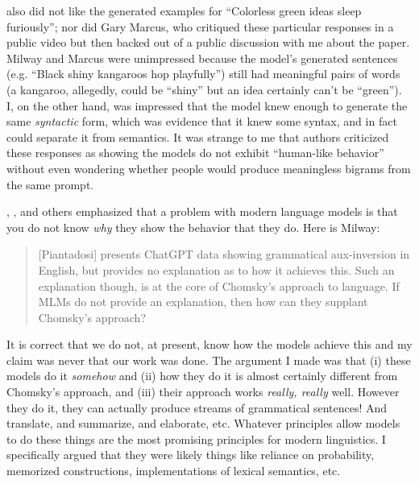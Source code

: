\documentclass[output=paper,colorlinks,citecolor=brown]{langscibook}
\begin{document}
\citet{milway2023response} also did not like the generated examples for ``Colorless green ideas sleep furiously''; nor did Gary Marcus, who critiqued these particular responses in a public video but then backed out of a public discussion with me about the paper. Milway and Marcus were unimpressed because the model's generated sentences (e.g. ``Black shiny kangaroos hop playfully'') still had meaningful pairs of words (a kangaroo, allegedly, could be ``shiny'' but an idea certainly can't be ``green''). I, on the other hand, was impressed that the model knew enough to generate the same \textit{syntactic} form, which was evidence that it knew some syntax, and in fact could separate it from semantics. It was strange to me that authors criticized these responses as showing the models do not exhibit ``human-like behavior'' without even wondering whether people would produce meaningless bigrams from the same prompt.

\citet{milway2023response}, \citet{kodner2023linguistics}, and others emphasized that a problem with modern language models is that you do not know \textit{why} they show the behavior that they do. Here is Milway:
\begin{quote}
[Piantadosi] presents ChatGPT data showing grammatical aux-inversion in English, but provides no explanation as to how it achieves this. Such an explanation though, is at the core of Chomsky’s approach to language. If MLMs do not provide an explanation, then how can they supplant Chomsky’s approach?
\end{quote}
It is correct that we do not, at present, know how the models achieve this and my claim was never that our work was done. The argument I made was that (i) these models do it \textit{somehow} and (ii) how they do it is almost certainly different from Chomsky's approach, and (iii) their approach works \textit{really, really} well. However they do it, they can actually produce streams of grammatical sentences! And translate, and summarize, and elaborate, etc. Whatever principles allow models to do these things are the most promising principles for modern linguistics. I specifically argued that they were likely things like reliance on probability, memorized constructions, implementations of lexical semantics, etc. 
\end{document}
